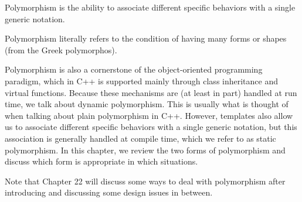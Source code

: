 Polymorphism is the ability to associate different specific behaviors with a single generic notation.

\begin{tcolorbox}[colback=webgreen!5!white,colframe=webgreen!75!black]
\hspace*{0.75cm}Polymorphism literally refers to the condition of having many forms or shapes (from the Greek polymorphos).
\end{tcolorbox}

Polymorphism is also a cornerstone of the object-oriented programming paradigm, which in C++ is supported mainly through class inheritance and virtual functions. Because these mechanisms are (at least in part) handled at run time, we talk about dynamic polymorphism. This is usually what is thought of when talking about plain polymorphism in C++. However, templates also allow us to associate different specific behaviors with a single generic notation, but this association is generally handled at compile time, which we refer to as static polymorphism. In this chapter, we review the two forms of polymorphism and discuss which form is appropriate in which situations. 

Note that Chapter 22 will discuss some ways to deal with polymorphism after introducing and discussing some design issues in between.